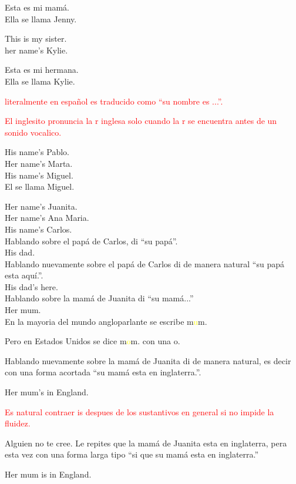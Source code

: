 Esta es mi mamá.\\
Ella se llama Jenny.

This is my sister.\\
her name's Kylie.

Esta es mi hermana.\\
Ella se llama Kylie.

\textcolor{red}{literalmente en español es traducido como
``su nombre es ...''.}

\textcolor{red}{El inglesito pronuncia la r inglesa solo cuando la r
se encuentra antes de un sonido vocalico.}

His name's Pablo.\\
Her name's Marta.\\

His name's Miguel.\\
El se llama Miguel.

Her name's Juanita.\\

Her name's Ana Maria.\\
His name's Carlos.\\

Hablando sobre el papá de Carlos, di ``su papá''.\\
His dad.\\

Hablando nuevamente sobre el papá de Carlos di de manera natural
``su papá esta aquí.''.\\
His dad's here.\\

Hablando sobre la mamá de Juanita di ``su mamá...''\\
Her mum.\\

En la mayoria del mundo angloparlante se escribe m\textcolor{yellow}{u}m.

Pero en Estados Unidos se dice m\textcolor{yellow}{o}m. con una o.

Hablando nuevamente sobre la mamá de Juanita di de manera natural, es decir
con una forma acortada ``su mamá esta en inglaterra.''.

Her mum's in England.

\textcolor{red}{Es natural contraer is despues de los sustantivos en general
si no impide la fluidez.}

Alguien no te cree. Le repites que la mamá de Juanita esta en inglaterra,
pera esta vez con una forma larga tipo ``si que su mamá esta en inglaterra.''

Her mum is in England.

